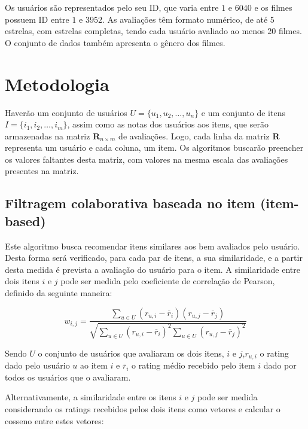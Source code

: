\documentclass[12pt,a4paper,header]{abnt}
\begin{document}
Os usuários são representados pelo seu ID, que varia entre $1$ e $6040$ e os filmes possuem ID entre $1$ e $3952$. As avaliações têm formato numérico, de até 5 estrelas, com estrelas completas, tendo cada usuário avaliado ao menos 20 filmes. O conjunto de dados também apresenta o gênero dos filmes.

\section{Metodologia}

Haverão um conjunto de usuários $U = \{u_1, u_2, \ldots, u_n\}$ e um conjunto de itens $I = \{i_1, i_2, \ldots, i_m \}$, assim como as notas dos usuários aos itens, que serão armazenadas na matriz $\boldsymbol{R}_{n \times m}$ de avaliações\cite{hahsler2015recommenderlab}. Logo, cada linha da matriz $\boldsymbol{R}$ representa um usuário e cada coluna, um item. Os algoritmos buscarão preencher os valores faltantes desta matriz, com valores na mesma escala das avaliações presentes na matriz\cite{takahashi2015estudo}.

\subsection{Filtragem colaborativa baseada no item (item-based)}

Este algoritmo busca recomendar itens similares aos bem avaliados pelo usuário. Desta forma será verificado, para cada par de itens, a sua similaridade, e a partir desta medida é prevista a avaliação do usuário para o item. A similaridade entre dois itens $i$ e $j$ pode ser medida pelo coeficiente de correlação de Pearson, definido da seguinte maneira\cite{melville2011recommender}:

\begin{equation}
w_{i, j} = \frac{\sum_{u \in U}{(r_{u, i} - \overline{r}_i ) ( r_{u, j} - \overline{r}_j )}}{\sqrt{\sum_{u \in U}{(r_{u, i} - \overline{r}_i )^2} \sum_{u \in U}{(r_{u, j} - \overline{r}_j )^2}}}
\end{equation}

Sendo $U$ o conjunto de usuários que avaliaram os dois itens, $i$ e $j$,$r_{u, i}$ o rating dado pelo usuário $u$ ao item $i$ e $\overline{r}_i$ o rating médio recebido pelo item $i$ dado por todos os usuários que o avaliaram.

Alternativamente, a similaridade entre os itens $i$ e $j$ pode ser medida considerando os ratings recebidos pelos dois itens como vetores e calcular o cosseno entre estes vetores\cite{sarwar2001item}:
\end{document}
